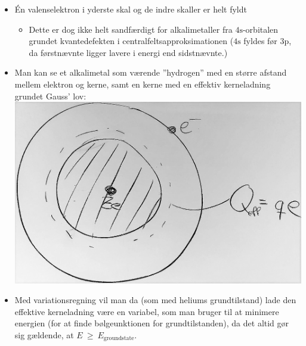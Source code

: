 \begin{itemize}
    \item Én valenselektron i yderste skal og de indre skaller er helt fyldt
    \begin{itemize}
        \item Dette er dog ikke helt sandfærdigt for alkalimetaller fra $4\text{s}$-orbitalen grundet kvantedefekten i centralfeltsapproksimationen ($4\text{s}$ fyldes før $3\text{p}$, da førstnævnte ligger lavere i energi end sidstnævnte.)
    \end{itemize}
    \item Man kan se et alkalimetal som værende ''hydrogen'' med en større afstand mellem elektron og kerne, samt en kerne med en effektiv kerneladning grundet Gauss' lov:\\
    
    \includegraphics[width=.8\textwidth]{Q14/images/AlkaliSomHydrogenMedEffektivKerneladning.png}
    \item Med variationsregning vil man da (som med heliums grundtilstand) lade den effektive kerneladning være en variabel, som man bruger til at minimere energien (for at finde bølgeunktionen for grundtilstanden), da det altid gør sig gældende, at $E~\ge~E_\text{groundstate}$.
\end{itemize}
\normalsize
